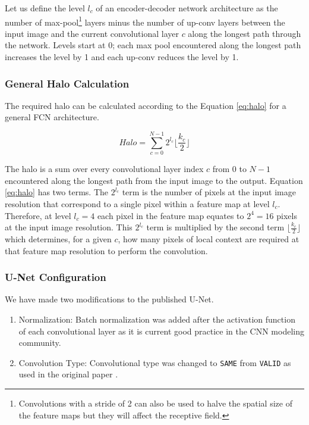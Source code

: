 \documentclass[runningheads]{llncs}
\begin{document}
Let us define the level $l_{c}$ of an encoder-decoder network architecture as the number of max-pool\footnote{Convolutions with a stride of 2 can also be used to halve the spatial size of the feature maps but they will affect the receptive field.} layers minus the number of up-conv layers between the input image and the current convolutional layer $c$ along the longest path through the network. Levels start at 0; each max pool encountered along the longest path increases the level by 1 and each up-conv reduces the level by 1. 


\subsubsection{General Halo Calculation}

The required halo can be calculated according to the Equation \ref{eq:halo} for a general FCN architecture. 

\begin{equation}
Halo = \sum_{c=0}^{N-1} 2^{l_c} \lfloor \frac{k_c}{2} \rfloor
\label{eq:halo}
\end{equation}

The halo is a sum over every convolutional layer index $c$ from $0$ to $N-1$ encountered along the longest path from the input image to the output. 
Equation \ref{eq:halo} has two terms. The $2^{l_c}$ term is the number of pixels at the input image resolution that correspond to a single pixel within a feature map at level $l_c$. 
Therefore, at level $l_c=4$ each pixel in the feature map equates to $2^4 = 16$ pixels at the input image resolution. This $2^{l_c}$ term is multiplied by the second term $\lfloor \frac{k_c}{2} \rfloor$ which determines, for a given $c$, how many pixels of local context are required at that feature map resolution to perform the convolution.

\subsubsection{U-Net Configuration}

We have made two modifications to the published U-Net. 

\begin{enumerate}
	\item Normalization: Batch normalization \cite{ioffe2015batch} was added after the activation function of each convolutional layer as it is current good practice in the CNN modeling community. 
	\item Convolution Type: Convolutional type was changed to \texttt{SAME} from \texttt{VALID} as used in the original paper \cite{Ronneberger2015a}.
\end{enumerate}
\end{document}
